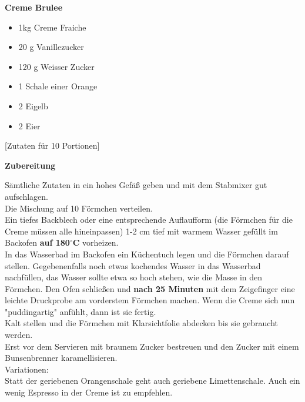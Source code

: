 
\parindent0pt	

\pagestyle{empty}


\textbf{{\LARGE Creme Brulee}}%


\hrulefill
\vspace*{\fill}
\begin{multicols}{2}	


\begin{itemize}
\item 1kg    Creme Fraiche
\item 20 g     Vanillezucker
\item 120 g    Weisser Zucker
\item 1     Schale einer Orange
\item 2    Eigelb
\item 2     Eier
\end{itemize}

\end{multicols}

\vspace{1cm}
\begin{center}
[Zutaten für 10 Portionen]
\end{center}

\vfill
\newpage
\textbf{{\LARGE Zubereitung}}%

\hrulefill

\vspace*{\fill}
\begin{multicols}{2}


Sämtliche Zutaten in ein hohes Gefäß geben und mit dem Stabmixer gut aufschlagen.\\
Die Mischung auf 10 Förmchen verteilen.\\
 
Ein tiefes Backblech oder eine entsprechende Auflaufform (die Förmchen für die Creme müssen alle hineinpassen)
1-2 cm tief mit warmem Wasser gefüllt im Backofen \textbf{auf 180$^\circ$C} vorheizen.\\

In das Wasserbad im Backofen ein Küchentuch legen und die Förmchen darauf stellen. 
Gegebenenfalls noch etwas kochendes Wasser in das Wasserbad nachfüllen, das Wasser sollte etwa so hoch stehen, 
wie die Masse in den Förmchen. 
Den Ofen schließen und \textbf{nach 25 Minuten} mit dem Zeigefinger eine leichte Druckprobe am vorderstem Förmchen machen. 
Wenn die Creme sich nun "puddingartig" anfühlt, dann ist sie fertig.\\
Kalt stellen und die Förmchen mit Klarsichtfolie abdecken bis sie gebraucht werden.\\ 
Erst vor dem Servieren mit braunem Zucker bestreuen und den Zucker mit einem Bunsenbrenner karamellisieren.\\


Variationen:\\ 
Statt der geriebenen Orangenschale geht auch geriebene Limettenschale.
Auch ein wenig Espresso in der Creme ist zu empfehlen.


\end{multicols}
\vfill
